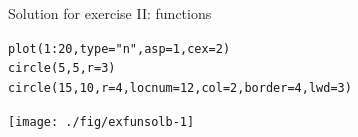 \documentclass[xcolor=table,       handout,    xcolor=dvipsnames]{beamer}\usepackage[]{graphicx}\usepackage[]{color}
\makeatletter
\newcommand{\hlnum}[1]{\textcolor[rgb]{0,0,0}{#1}}
\newcommand{\hlstr}[1]{\textcolor[rgb]{0.545,0.137,0.137}{#1}}
\newcommand{\hlopt}[1]{\textcolor[rgb]{0,0,0}{#1}}
\newcommand{\hlstd}[1]{\textcolor[rgb]{0,0,0}{#1}}
\newcommand{\hlkwc}[1]{\textcolor[rgb]{1,0,1}{#1}}
\newcommand{\hlkwd}[1]{\textcolor[rgb]{0,0,1}{#1}}
\newenvironment{kframe}{%
 \def\at@end@of@kframe{}%
 \ifinner\ifhmode%
  \def\at@end@of@kframe{\end{minipage}}%
  \begin{minipage}{\columnwidth}%
 \fi\fi%
 \def\FrameCommand##1{\hskip\@totalleftmargin \hskip-\fboxsep
 \colorbox{shadecolor}{##1}\hskip-\fboxsep
     \hskip-\linewidth \hskip-\@totalleftmargin \hskip\columnwidth}%
 \MakeFramed {\advance\hsize-\width
   \@totalleftmargin\z@ \linewidth\hsize
   \@setminipage}}%
 {\par\unskip\endMakeFramed%
 \at@end@of@kframe}
\newenvironment{knitrout}{}{} %
\newcounter{exercisecount}
\makeatother
\begin{document}

\begin{frame}[fragile]{Solution for exercise  II: functions}
\begin{knitrout}
\color{fgcolor}\begin{kframe}
\begin{alltt}
\hlkwd{plot}\hlstd{(}\hlnum{1}\hlopt{:}\hlnum{20}\hlstd{,} \hlkwc{type}\hlstd{=}\hlstr{"n"}\hlstd{,} \hlkwc{asp}\hlstd{=}\hlnum{1}\hlstd{,} \hlkwc{cex}\hlstd{=}\hlnum{2}\hlstd{)}
\hlkwd{circle}\hlstd{(}\hlnum{5}\hlstd{,}\hlnum{5}\hlstd{,} \hlkwc{r}\hlstd{=}\hlnum{3}\hlstd{)}
\hlkwd{circle}\hlstd{(}\hlnum{15}\hlstd{,}\hlnum{10}\hlstd{,} \hlkwc{r}\hlstd{=}\hlnum{4}\hlstd{,} \hlkwc{locnum}\hlstd{=}\hlnum{12}\hlstd{,} \hlkwc{col}\hlstd{=}\hlnum{2}\hlstd{,} \hlkwc{border}\hlstd{=}\hlnum{4}\hlstd{,} \hlkwc{lwd}\hlstd{=}\hlnum{3}\hlstd{)}
\end{alltt}
\end{kframe}

{\centering \texttt{[image: ./fig/exfunsolb-1]} 

}



\end{knitrout}
\end{frame}

\end{document}
